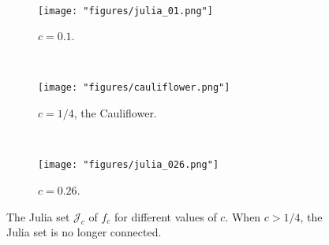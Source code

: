 \begin{figure*}[t!] 
    \centering
    ~ 
    \begin{subfigure}[t]{0.3\textwidth}
        \centering
        \texttt{[image: "figures/julia\_01.png"]}
        \caption{$c=0.1$.}
    \end{subfigure}	
	~
    \begin{subfigure}[t]{0.25\textwidth}
        \centering
        \texttt{[image: "figures/cauliflower.png"]}
        \caption{$c=1/4$, the Cauliflower.}
    \end{subfigure}%
    ~ 
    \begin{subfigure}[t]{0.3\textwidth}
        \centering
        \texttt{[image: "figures/julia\_026.png"]}
        \caption{$c=0.26$.}
    \end{subfigure}
    \caption{The Julia set $\mathcal J_c$ of $f_c$ for different values of $c$. When $c>1/4$, the Julia set is no longer connected.}    \label{fig:julia_sets}

\end{figure*}

